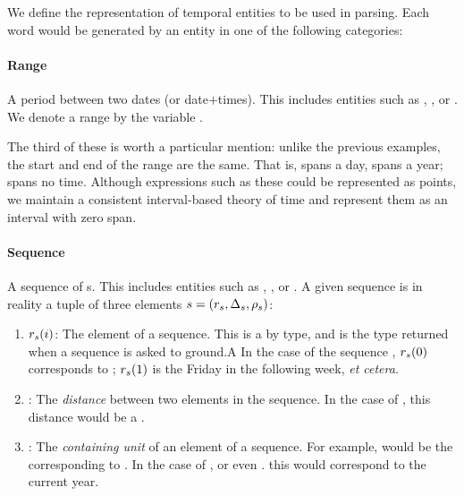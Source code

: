 

We define the representation of temporal entities to be used in parsing.
Each word would be generated by an entity in one of the following categories:
\paragraph{Range}
A period between two dates (or date$+$times).
This includes entities such as , , or
	.
We denote a range by the variable \range.

The third of these is worth a particular mention:
	unlike the previous examples, the start and end of the range are the same.
That is,  spans a day,  spans a year; 
	spans no time.
Although expressions such as these could be represented as points,
	we maintain a consistent interval-based theory of time
	\cite{key:1981allen-temporal} and represent them as an interval with
	zero span.

\paragraph{Sequence}
A sequence of s.
This includes entities such as , , or
	.
A given sequence is in reality a tuple of three elements
	$s=(r_s,\Delta_s,\rho_s)$:
\begin{enumerate}
	\item $r_s(i)$: 
		The  element of a sequence.
		This is a  by type, and is the type returned when a sequence is
			asked to ground.A
		In the case of the sequence , $r_s(0)$ corresponds to
			; 
			$r_s(1)$ is the Friday in the following week, \textit{et cetera}.
	\item \seqjump:
		The \textit{distance} between two elements in the sequence.
		In the case of , this distance would be a .
	\item \seqcanon:
		The \textit{containing unit} of an element of a sequence.
		For example,  would be the 
			corresponding to .
		In the case of , or even . this 
			would correspond to the current year.
\end{enumerate}

